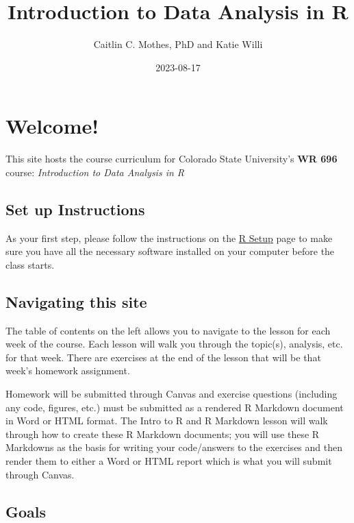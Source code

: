 \documentclass[
]{book}
\title{Introduction to Data Analysis in R}
\author{Caitlin C. Mothes, PhD and Katie Willi}
\date{2023-08-17}
\begin{document}
\maketitle

{
\setcounter{tocdepth}{1}
\tableofcontents
}
\hypertarget{welcome}{%
\chapter{Welcome!}\label{welcome}}

This site hosts the course curriculum for Colorado State University's \textbf{WR 696} course: \emph{Introduction to Data Analysis in R}

\hypertarget{set-up-instructions}{%
\section*{Set up Instructions}\label{set-up-instructions}}

As your first step, please follow the instructions on the \protect\hyperlink{setup-instructions}{R Setup} page to make sure you have all the necessary software installed on your computer before the class starts.

\hypertarget{navigating-this-site}{%
\section*{Navigating this site}\label{navigating-this-site}}

The table of contents on the left allows you to navigate to the lesson for each week of the course. Each lesson will walk you through the topic(s), analysis, etc. for that week. There are exercises at the end of the lesson that will be that week's homework assignment.

Homework will be submitted through Canvas and exercise questions (including any code, figures, etc.) must be submitted as a rendered R Markdown document in Word or HTML format. The Intro to R and R Markdown lesson will walk through how to create these R Markdown documents; you will use these R Markdowns as the basis for writing your code/answers to the exercises and then render them to either a Word or HTML report which is what you will submit through Canvas.

\hypertarget{goals}{%
\section*{Goals}\label{goals}}
\end{document}
